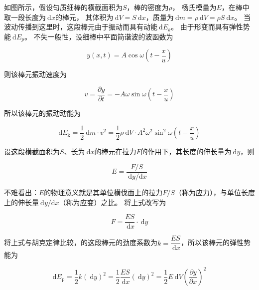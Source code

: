 \documentclass[12pt, a4paper]{article}
\numberwithin{equation}{section}
\newcommand{\rmd}{\mathrm{~d}}
\begin{document}
    如图所示，假设匀质细棒的橫截面积为\(S \)，棒的密度为\(\rho\)，
    杨氏模量为\(E \)，在棒中取一段长度为\(\rmd x\)的棒元，
    其体积为\(\rmd V=S\rmd x\)，质量为\(\rmd m =\rho \rmd V=\rho S\rmd x\)。
    当波动传播到这里时，这段棒元由于振动而具有动能\(\rmd E_k\)。
    由于形变而具有弹性势能\(\rmd E_p\)。 不失一般性，设细棒中平面简谐波的波函数为

    \begin{equation}
        y(x, t)=A \cos \omega\left(t-\frac{x}{u}\right)
        \label{7-3-1}
    \end{equation}

    则该棒元振动速度为

    \begin{equation}
        v=\frac{\partial y}{\partial t}=-A \omega \sin \omega\left(t-\frac{x}{u}\right)
    \end{equation}

    所以该棒元的振动动能为

    \begin{equation}
        \mathrm{d} E_{\mathrm{k}}=\frac{1}{2} \mathrm{~d} m \cdot v^2=
        \frac{1}{2} \rho \mathrm{~d} V \cdot A^2 \omega^2 \sin ^2 \omega\left(t-\frac{x}{u}\right)
    \end{equation}

    设这段横截面积为\(S \)、长为\(\rmd x\)的棒元在拉力\(F \)的作用下，其长度的伸长量为\(\rmd y\)，则

    \begin{equation}
        E=\frac{F / S}{\mathrm{~d} y / \mathrm{d} x}
    \end{equation}

    不难看出：$E$的物理意义就是其单位横伐面上的拉力$F / S$（称为应力），与单位长度上的伸长量$\rmd y / \mathrm{d} x$（称为应变）之比。
    将上式改写为
    
    \begin{equation}
        F=\frac{E S}{\mathrm{~d} x} \cdot \mathrm{~d} y
    \end{equation}

    将上式与胡克定律比较，的这段棒元的劲度系数为$k=\dfrac{E S}{\mathrm{~d} x}$，所以该棒元的弹性势能为

    \begin{equation}
        \mathrm{d} E_{\mathrm{p}}=\frac{1}{2} k(\mathrm{~d} y)^2=\frac{1}{2} \frac{E S}{\mathrm{~d} x}(\mathrm{~d} y)^2
        =\frac{1}{2} E \mathrm{~d} V\left(\frac{\partial y}{\partial x}\right)^2
        \label{7-3-6}
    \end{equation}
\end{document}
